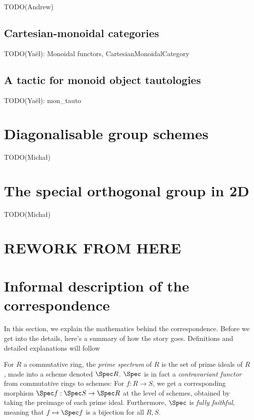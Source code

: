 \documentclass{article}
\begin{document}
TODO(Andrew)


\subsection{Cartesian-monoidal categories}


TODO(Yaël): Monoidal functors, CartesianMonoidalCategory


\subsection{A tactic for monoid object tautologies}


TODO(Yaël): mon_tauto


\section{Diagonalisable group schemes}


TODO(Michał)


\section{The special orthogonal group in 2D}


TODO(Michał)



\section{REWORK FROM HERE}


\section{Informal description of the correspondence}\label{sec:informal}


In this section, we explain the mathematics behind the correspondence.
Before we get into the details, here's a summary of how the story goes.
Definitions and detailed explanations will follow

For $R$ a commutative ring, the \emph{prime spectrum} of $R$ is the set of prime ideals of $R$,
made into a scheme denoted $\Spec R$.
$\Spec$ is in fact a \emph{contravariant functor} from commutative rings to schemes:
For $f : R \to S$, we get a corresponding morphism $\Spec f : \Spec S \to \Spec R$
at the level of schemes, obtained by taking the preimage of each prime ideal.
Furthermore, $\Spec$ is \emph{fully faithful},
meaning that $f \mapsto \Spec f$ is a bijection for all $R, S$.
\end{document}
